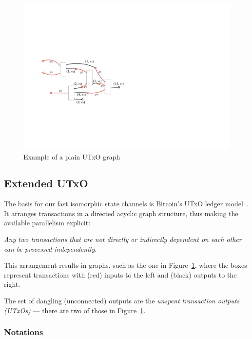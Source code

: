 \begin{figure}[t]
  \centering
 \includegraphics[width=\textwidth/2]{figures/utxo-graph.pdf}
 \caption{Example of a plain UTxO graph}
  \label{fig:utxo-graph}
\end{figure}

\subsection{Extended UTxO}
The basis for our fast isomorphic state channels is Bitcoin's UTxO ledger model~\cite{formal-model-of-bitcoin-transactions,Zahnentferner18-UTxO}. It arranges transactions in a directed acyclic graph structure, thus making the available parallelism explicit: 

\emph{Any two transactions that are not directly or indirectly dependent on each other can be processed independently.}

This arrangement results in graphs, such as the one in Figure~\ref{fig:utxo-graph},
where the boxes represent transactions with (red) inputs to the left and (black) outputs to the
right.

The set of dangling (unconnected) outputs are the \emph{unspent transaction outputs (UTxOs)} --- there are two of those in Figure~\ref{fig:utxo-graph}. 

\subsubsection{Notations}

